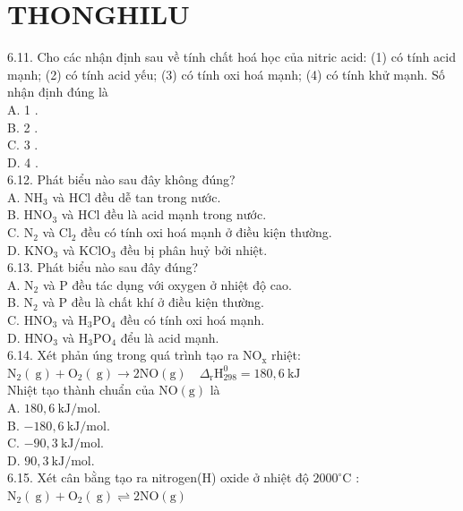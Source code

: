 \documentclass[10pt]{article}
\begin{document}
\section*{THONGHILU}
6.11. Cho các nhận định sau về tính chất hoá học của nitric acid: (1) có tính acid mạnh; (2) có tính acid yếu; (3) có tính oxi hoá mạnh; (4) có tính khử mạnh. Số nhận định đúng là\\
A. 1 .\\
B. 2 .\\
C. 3 .\\
D. 4 .\\
6.12. Phát biểu nào sau đây không đúng?\\
A. $\mathrm{NH}_{3}$ và HCl đều dễ tan trong nước.\\
B. $\mathrm{HNO}_{3}$ và HCl đều là acid mạnh trong nước.\\
C. $\mathrm{N}_{2}$ và $\mathrm{Cl}_{2}$ đều có tính oxi hoá mạnh ở điều kiện thường.\\
D. $\mathrm{KNO}_{3}$ và $\mathrm{KClO}_{3}$ đều bị phân huỷ bởi nhiệt.\\
6.13. Phát biểu nào sau đây đúng?\\
A. $\mathrm{N}_{2}$ và P đều tác dụng với oxygen ở nhiệt độ cao.\\
B. $\mathrm{N}_{2}$ và P đều là chất khí ở điều kiện thường.\\
C. $\mathrm{HNO}_{3}$ và $\mathrm{H}_{3} \mathrm{PO}_{4}$ đều có tính oxi hoá mạnh.\\
D. $\mathrm{HNO}_{3}$ và $\mathrm{H}_{3} \mathrm{PO}_{4}$ đểu là acid mạnh.\\
6.14. Xét phản úng trong quá trình tạo ra $\mathrm{NO}_{\mathrm{x}}$ rhiệt:\\
$\mathrm{N}_{2}(\mathrm{~g})+\mathrm{O}_{2}(\mathrm{~g}) \longrightarrow 2 \mathrm{NO}(\mathrm{g}) \quad \Delta_{\mathrm{r}} \mathrm{H}_{298}^{0}=180,6 \mathrm{~kJ}$\\
Nhiệt tạo thành chuẩn của $\mathrm{NO}(\mathrm{g})$ là\\
A. $180,6 \mathrm{~kJ} / \mathrm{mol}$.\\
B. $-180,6 \mathrm{~kJ} / \mathrm{mol}$.\\
C. $-90,3 \mathrm{~kJ} / \mathrm{mol}$.\\
D. $90,3 \mathrm{~kJ} / \mathrm{mol}$.\\
6.15. Xét cân bằng tạo ra nitrogen(H) oxide ở nhiệt độ $2000^{\circ} \mathrm{C}$ :\\
$\mathrm{N}_{2}(\mathrm{~g})+\mathrm{O}_{2}(\mathrm{~g}) \rightleftharpoons 2 \mathrm{NO}(\mathrm{g})$\\
\end{document}
